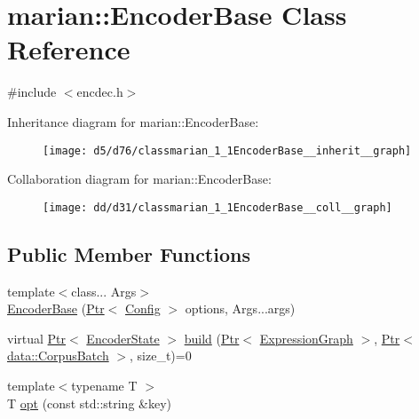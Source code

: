 \hypertarget{classmarian_1_1EncoderBase}{}\section{marian\+:\+:Encoder\+Base Class Reference}
\label{classmarian_1_1EncoderBase}


{\ttfamily \#include $<$encdec.\+h$>$}



Inheritance diagram for marian\+:\+:Encoder\+Base\+:
\nopagebreak
\begin{figure}[H]
\begin{center}
\leavevmode
\texttt{[image: d5/d76/classmarian\_1\_1EncoderBase\_\_inherit\_\_graph]}
\end{center}
\end{figure}


Collaboration diagram for marian\+:\+:Encoder\+Base\+:
\nopagebreak
\begin{figure}[H]
\begin{center}
\leavevmode
\texttt{[image: dd/d31/classmarian\_1\_1EncoderBase\_\_coll\_\_graph]}
\end{center}
\end{figure}
\subsection*{Public Member Functions}
\begin{DoxyCompactItemize}
\item 
{\footnotesize template$<$class... Args$>$ }\\\hyperlink{classmarian_1_1EncoderBase_aba592bf63d3b015bdc41fc06d7fa3a59}{Encoder\+Base} (\hyperlink{namespacemarian_ad1a373be43a00ef9ce35666145137b08}{Ptr}$<$ \hyperlink{classmarian_1_1Config}{Config} $>$ options, Args...\+args)
\item 
virtual \hyperlink{namespacemarian_ad1a373be43a00ef9ce35666145137b08}{Ptr}$<$ \hyperlink{classmarian_1_1EncoderState}{Encoder\+State} $>$ \hyperlink{classmarian_1_1EncoderBase_a7404d245bf899d6d8023d56407d81272}{build} (\hyperlink{namespacemarian_ad1a373be43a00ef9ce35666145137b08}{Ptr}$<$ \hyperlink{classmarian_1_1ExpressionGraph}{Expression\+Graph} $>$, \hyperlink{namespacemarian_ad1a373be43a00ef9ce35666145137b08}{Ptr}$<$ \hyperlink{classmarian_1_1data_1_1CorpusBatch}{data\+::\+Corpus\+Batch} $>$, size\+\_\+t)=0
\item 
{\footnotesize template$<$typename T $>$ }\\T \hyperlink{classmarian_1_1EncoderBase_aff87b618b2754b99eaf961e95739366d}{opt} (const std\+::string \&key)
\end{DoxyCompactItemize}
